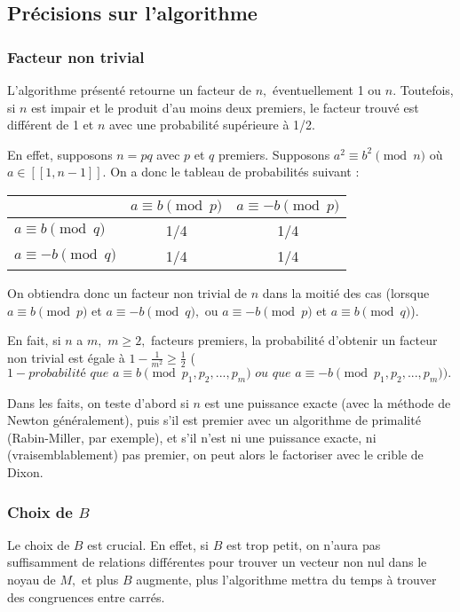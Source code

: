 \documentclass[french, 12pt, titlepage]{article}
\begin{document}
\subsection{Précisions sur l'algorithme}

\subsubsection{Facteur non trivial}

L'algorithme présenté retourne un facteur de $n,$ éventuellement 1 ou
$n.$ Toutefois, si $n$ est impair et le produit d'au moins deux
premiers, le facteur trouvé est différent de 1 et $n$ avec une
probabilité supérieure à 1/2. 

En effet, supposons $n = pq$ avec $p$ et $q$ premiers. Supposons $a^2 \equiv b^2 \pmod n$
où $a \in [\![1, n-1]\!].$ On a donc le tableau de probabilités
suivant : 
\begin{center}
\begin{tabular}{l|c|c}
 & $a \equiv b \pmod p$ & $a \equiv -b \pmod p$ \\
\hline
$a \equiv b \pmod q$ & 1/4 & 1/4 \\
\hline
$a \equiv -b \pmod q$ & 1/4 & 1/4 \\
\end{tabular}
\end{center}
On obtiendra donc un facteur non trivial de $n$ dans la moitié des cas
(lorsque $a \equiv b \pmod p$ et $a \equiv -b \pmod q,$ ou $a \equiv -b \pmod p$ et $a \equiv b \pmod q$).

En fait, si $n$ a $m,$ $m \geq 2,$ facteurs premiers, la probabilité d'obtenir un
facteur non trivial est égale à $1 - \frac{1}{m^2} \geq \frac{1}{2}$
($1 - \textit{probabilité que } a \equiv b \pmod {p_1, p_2, ..., p_m} \textit{ ou que } a \equiv -b \pmod {p_1, p_2, ..., p_m}).$

Dans les faits, on teste d'abord si $n$ est une puissance exacte (avec la méthode de Newton généralement), puis s'il est premier avec un algorithme de primalité (Rabin-Miller, par
exemple), et s'il n'est ni une puissance exacte, ni (vraisemblablement) pas premier, on peut alors le
factoriser avec le crible de Dixon.


\subsubsection{Choix de $B$}

Le choix de $B$ est crucial. En effet, si $B$ est trop petit, on
n'aura pas suffisamment de relations différentes pour trouver un
vecteur non nul dans le noyau de $M,$ et plus $B$ augmente, plus
l'algorithme mettra du temps à trouver des congruences entre carrés. 
\end{document}
